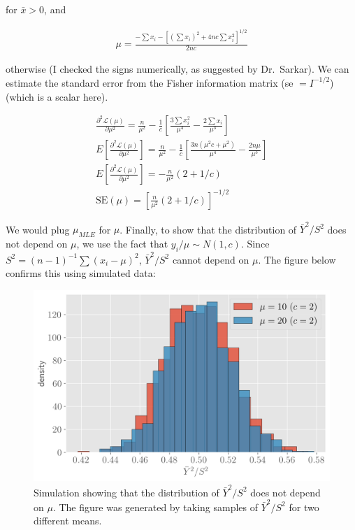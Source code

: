 \documentclass[11pt]{article}
\begin{document}
 for $\bar{x} > 0$, and 
 
 \begin{align*}
     \mu = \frac{-\sum x_i - [(\sum x_i)^2 + 4nc \sum x_i^2]^{1/2}}{2nc}
 \end{align*}
 
 otherwise (I checked the signs numerically, as suggested by Dr.\ Sarkar). We can estimate the standard error from the Fisher information matrix (se $= I^{-1/2}$) (which is a scalar here).
 
 \begin{align*}
     \frac{\partial ^2 \mathcal{L}(\mu)}{\partial \mu^2} = \frac{n}{\mu^2}-\frac{1}{c}\left[\frac{3\sum x_i^2}{\mu^4}-\frac{2\sum x_i}{\mu^3}\right] \\
     E\left[\frac{\partial ^2 \mathcal{L}(\mu)}{\partial \mu^2}\right] = \frac{n}{\mu^2}-\frac{1}{c}\left[\frac{3 n(\mu^2c+\mu^2)}{\mu^4}-\frac{2n\mu}{\mu^3}\right] \\
      E\left[\frac{\partial ^2 \mathcal{L}(\mu)}{\partial \mu^2}\right] =  -\frac{n}{\mu^2} (2+1/c)\\
      \text{SE}(\mu) =  [\frac{n}{\mu^2} (2+1/c)]^{-1/2}
 \end{align*}
 
We would plug $\mu_{MLE}$ for $\mu$. Finally, to show that the distribution of $\bar{Y}^2/S^2$ does not depend on $\mu$, we use the fact that $y_i/\mu \sim N(1, c)$. Since $S^2 =  (n-1)^{-1} \sum(x_i-\mu)^2$,  $\bar{Y}^2/S^2$  cannot depend on $\mu$. The figure below confirms this using simulated data:


 
\begin{figure}[!h]
    \centering
    \includegraphics[scale=.55]{homework_2/figures/no_dept.png}
    \caption{Simulation showing that the distribution of $\bar{Y}^2/S^2$ does not depend on $\mu$. The figure was generated by taking samples of $\bar{Y}^2/S^2$ for two different means.}
    \label{fig:my_label}
\end{figure}
 \newpage
 
\end{document}
